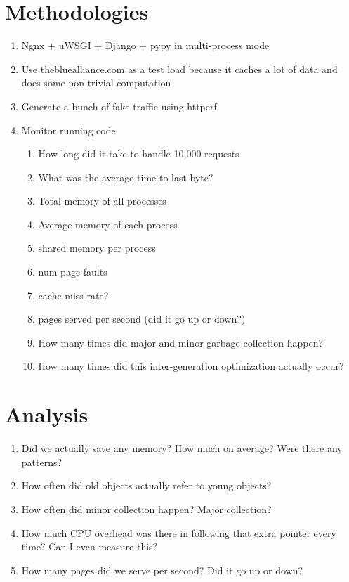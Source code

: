 \documentclass{article}
\begin{document}
\section{Methodologies}\label{sec:method}
\begin{enumerate}
    \item Ngnx + uWSGI + Django + pypy in multi-process mode
    \item Use thebluealliance.com as a test load because it caches a lot of data and does some non-trivial computation
    \item Generate a bunch of fake traffic using httperf
    \item Monitor running code
        \begin{enumerate}
            \item How long did it take to handle 10,000 requests
            \item What was the average time-to-last-byte?
            \item Total memory of all processes
            \item Average memory of each process
            \item shared memory per process
            \item num page faults
            \item cache miss rate?
            \item pages served per second (did it go up or down?)
            \item How many times did major and minor garbage collection happen?
            \item How many times did this inter-generation optimization actually occur?
        \end{enumerate}
\end{enumerate}

\section{Analysis}\label{sec:analysis}
\begin{enumerate}
    \item Did we actually save any memory?  How much on average?  Were there any patterns?   
    \item How often did old objects actually refer to young objects?  
    \item How often did minor collection happen?  Major collection?
    \item How much CPU overhead was there in following that extra pointer every time?  Can I even measure this?
    \item How many pages did we serve per second?  Did it go up or down?
\end{enumerate}
\end{document}
